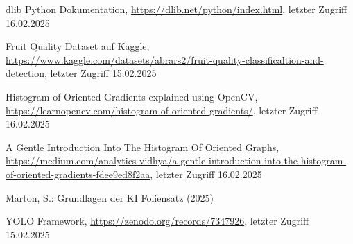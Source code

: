 \documentclass[runningheads]{llncs}
\begin{document}
\begin{thebibliography}{8}
dlib Python Dokumentation, \url{https://dlib.net/python/index.html}, letzter Zugriff 16.02.2025

Fruit Quality Dataset auf Kaggle, \url{https://www.kaggle.com/datasets/abrars2/fruit-quality-classificaltion-and-detection}, letzter Zugriff 15.02.2025

Histogram of Oriented Gradients explained using OpenCV, \url{https://learnopencv.com/histogram-of-oriented-gradients/}, letzter Zugriff 16.02.2025

A Gentle Introduction Into The Histogram Of Oriented Graphs, \url{https://medium.com/analytics-vidhya/a-gentle-introduction-into-the-histogram-of-oriented-gradients-fdee9ed8f2aa}, letzter Zugriff 16.02.2025

Marton, S.: Grundlagen der KI Foliensatz (2025)

YOLO Framework, \url{https://zenodo.org/records/7347926}, letzter Zugriff 15.02.2025




\end{thebibliography}
\end{document}
